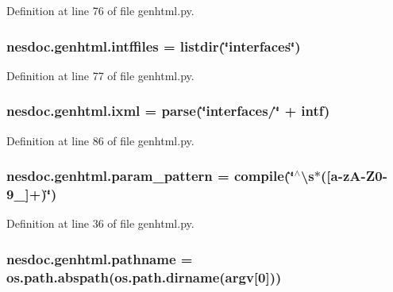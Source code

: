 Definition at line 76 of file genhtml.\+py.

\subsubsection[{\texorpdfstring{intffiles}{intffiles}}]{\setlength{\rightskip}{0pt plus 5cm}nesdoc.\+genhtml.\+intffiles = listdir(\char`\"{}interfaces\char`\"{})}\hypertarget{namespacenesdoc_1_1genhtml_a23b54662088644f83fd0e0b716512acc}{}\label{namespacenesdoc_1_1genhtml_a23b54662088644f83fd0e0b716512acc}


Definition at line 77 of file genhtml.\+py.

\subsubsection[{\texorpdfstring{ixml}{ixml}}]{\setlength{\rightskip}{0pt plus 5cm}nesdoc.\+genhtml.\+ixml = parse(\char`\"{}interfaces/\char`\"{} + intf)}\hypertarget{namespacenesdoc_1_1genhtml_a38b1cb117ee92811743c3a46427503d0}{}\label{namespacenesdoc_1_1genhtml_a38b1cb117ee92811743c3a46427503d0}


Definition at line 86 of file genhtml.\+py.

\subsubsection[{\texorpdfstring{param\+\_\+pattern}{param_pattern}}]{\setlength{\rightskip}{0pt plus 5cm}nesdoc.\+genhtml.\+param\+\_\+pattern = compile(\char`\"{}$^\wedge$\textbackslash{}s$\ast$(\mbox{[}a-\/zA-\/Z0-\/9\+\_\+\mbox{]}+)\char`\"{})}\hypertarget{namespacenesdoc_1_1genhtml_a4638dba17d829583af3cb06893893ec3}{}\label{namespacenesdoc_1_1genhtml_a4638dba17d829583af3cb06893893ec3}


Definition at line 36 of file genhtml.\+py.

\subsubsection[{\texorpdfstring{pathname}{pathname}}]{\setlength{\rightskip}{0pt plus 5cm}nesdoc.\+genhtml.\+pathname = os.\+path.\+abspath(os.\+path.\+dirname(argv\mbox{[}0\mbox{]}))}\hypertarget{namespacenesdoc_1_1genhtml_a1c2d61a98dce76b296cfa2b6c9ceb32e}{}\label{namespacenesdoc_1_1genhtml_a1c2d61a98dce76b296cfa2b6c9ceb32e}


